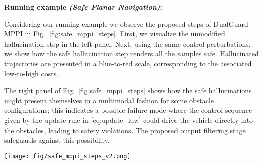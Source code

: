 \begin{mdframed}[style=MyFrame,nobreak=false]

\textbf{Running example \textit{(Safe Planar Navigation)}:}

Considering our running example we observe the proposed steps of DualGuard MPPI in Fig.~\ref{fig:safe_mppi_steps}. First, we visualize the unmodified hallucination step in the left panel. Next, using the same control perturbations, we show how the safe hallucination step renders all the samples safe. Hallucinated trajectories are presented in a blue-to-red scale, corresponding to the associated low-to-high costs.

The right panel of Fig.~\ref{fig:safe_mppi_steps} shows how the safe hallucinations might present themselves in a multimodal fashion for some obstacle configurations; this indicates a possible failure mode where the control sequence given by the update rule in \eqref{eq:update_law} could drive the vehicle directly into the obstacles, leading to safety violations. The proposed output filtering stage safeguards against this possibility.  

\vspace{1em}
{\centering      \texttt{[image: fig/safe\_mppi\_steps\_v2.png]}
      \label{fig:safe_mppi_steps}\par} 

\end{mdframed}





